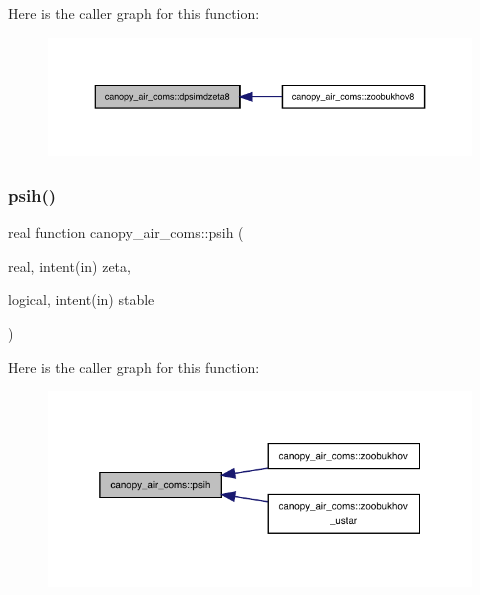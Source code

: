 Here is the caller graph for this function\+:
\nopagebreak
\begin{figure}[H]
\begin{center}
\leavevmode
\includegraphics[width=350pt]{namespacecanopy__air__coms_a51b006ac118f9549aee23ddb61a1bf19_icgraph}
\end{center}
\end{figure}
\mbox{\label{namespacecanopy__air__coms_acedb0f66db4b79009a69e87c5fd3ed71}} 
\subsubsection{\texorpdfstring{psih()}{psih()}}
{\footnotesize\ttfamily real function canopy\+\_\+air\+\_\+coms\+::psih (\begin{DoxyParamCaption}\item[{real, intent(in)}]{zeta,  }\item[{logical, intent(in)}]{stable }\end{DoxyParamCaption})}

Here is the caller graph for this function\+:
\nopagebreak
\begin{figure}[H]
\begin{center}
\leavevmode
\includegraphics[width=325pt]{namespacecanopy__air__coms_acedb0f66db4b79009a69e87c5fd3ed71_icgraph}
\end{center}
\end{figure}
\mbox{\label{namespacecanopy__air__coms_aef33f0eeea82151a8edb6dc38c4cc921}} 
